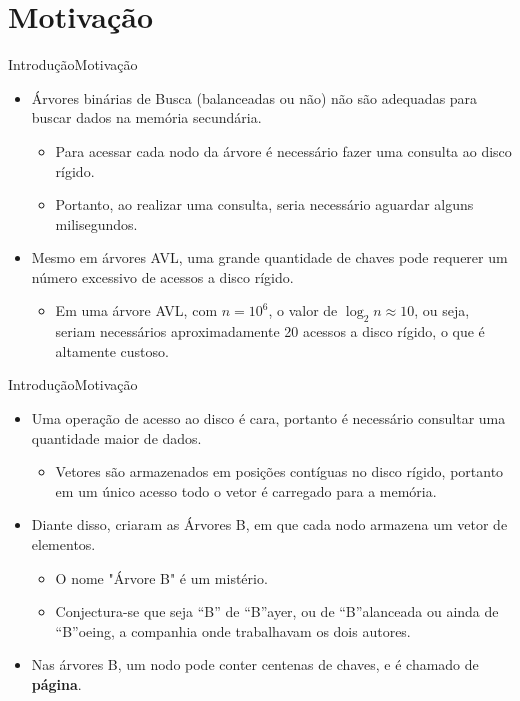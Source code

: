 \documentclass[aspectratio=169]{beamer}
\begin{document}
\section{Motivação}

\begin{frame}{Introdução}{Motivação}
\begin{itemize}
\item Árvores binárias de Busca (balanceadas ou não) não são adequadas para buscar dados na memória secundária.
\begin{itemize}
\item Para acessar cada nodo da árvore é necessário fazer uma consulta ao disco rígido.
\item Portanto, ao realizar uma consulta, seria necessário aguardar alguns milisegundos.
\end{itemize}
\item Mesmo em árvores AVL, uma grande quantidade de chaves pode requerer um número excessivo de acessos a disco rígido. 
\begin{itemize}
\item Em uma árvore AVL, com $n = 10^6$, o valor de $\log_2 n \approx 10$, ou seja, seriam necessários aproximadamente 20 acessos a disco rígido, o que é altamente custoso.
\end{itemize}
\end{itemize}
\end{frame}


\begin{frame}{Introdução}{Motivação}
\begin{itemize}
\item Uma operação de acesso ao disco é cara, portanto é necessário consultar uma quantidade maior de dados.
\begin{itemize}
\item Vetores são armazenados em posições contíguas no disco rígido, portanto em um único acesso todo o vetor é carregado para a memória.
\end{itemize}
\item Diante disso, \cite{Bayer1970} criaram as Árvores B, em que cada nodo armazena um vetor de elementos.
\begin{itemize}
\item O nome "Árvore B" é um mistério.
\item Conjectura-se que seja ``B'' de ``B''ayer, ou de ``B''alanceada ou ainda de ``B''oeing, a companhia onde trabalhavam os dois autores.
\end{itemize}
\item Nas árvores B, um nodo pode conter centenas de chaves, e é chamado de {\bf página}.
\end{itemize}
\end{frame}
\end{document}
